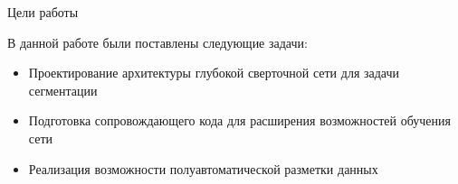 
\begin{frame}{Цели работы}
\begin{block}{}
    В данной работе были поставлены следующие задачи:
\begin{itemize}
    \item Проектирование архитектуры глубокой сверточной сети для задачи сегментации
    \item Подготовка сопровождающего кода для расширения возможностей обучения сети
    \item Реализация возможности полуавтоматической разметки данных
\end{itemize}
\end{block}
\end{frame}